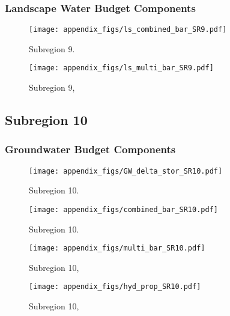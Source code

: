 \subsubsection{Landscape Water Budget Components}
\begin{figure}[ht]
\centerline{\texttt{[image: appendix\_figs/ls\_combined\_bar\_SR9.pdf]}}
\caption{\LSCombinedTextOne Subregion 9.\LSCombinedTextTwo}
\label{fig:LS_budget_SR9}
\end{figure}
\newpage

\begin{landscape}
\begin{figure}[ht]
\centerline{\texttt{[image: appendix\_figs/ls\_multi\_bar\_SR9.pdf]}}
\caption{\LSMultiTextOne Subregion 9,\LSMultiTextTwo}
\label{fig:multi_LS_budget_SR9}
\end{figure}
\newpage
\end{landscape}

\subsection{Subregion 10}
\subsubsection{Groundwater Budget Components}
\begin{figure}[h]
\centerline{\texttt{[image: appendix\_figs/GW\_delta\_stor\_SR10.pdf]}}
\caption{\GWBudgetText Subregion 10.}
\label{fig:delta_stor_SR10}
\end{figure}
\newpage

\begin{figure}[ht]
\centerline{\texttt{[image: appendix\_figs/combined\_bar\_SR10.pdf]}}
\caption{\GWCombinedTextOne Subregion 10.\GWCombinedTextTwo}
\label{fig:GW_budget_SR10}
\end{figure}
\newpage

\begin{landscape}
\begin{figure}[ht]
\centerline{\texttt{[image: appendix\_figs/multi\_bar\_SR10.pdf]}}
\caption{\GWMultiTextOne Subregion 10,\GWMultiTextTwo}
\label{fig:multi_GW_budget_SR10}
\end{figure}
\newpage

\begin{figure}[ht]
\centerline{\texttt{[image: appendix\_figs/hyd\_prop\_SR10.pdf]}}
\caption{\HydPropOne Subregion 10,\HydPropTwo}
\label{fig:hyd_prop_SR10}
\end{figure}
\newpage
\end{landscape}

